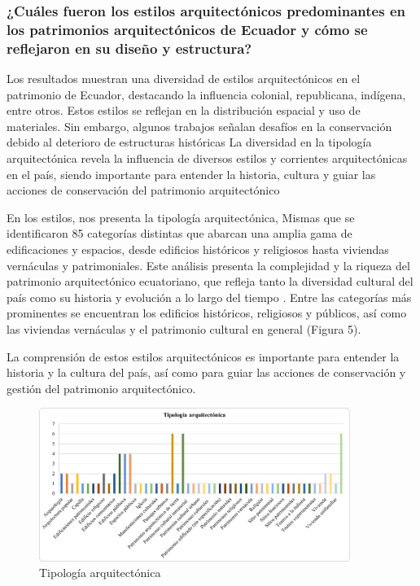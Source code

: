 \documentclass[journal,article,submit,pdftex,moreauthors]{Definitions/mdpi}
\begin{document}
\subsubsection{\textbf{¿Cuáles fueron los estilos arquitectónicos predominantes en los patrimonios arquitectónicos de Ecuador y cómo se reflejaron en su diseño y estructura?}}
\par %
Los resultados muestran una diversidad de estilos arquitectónicos en el patrimonio de Ecuador, destacando la influencia colonial, republicana, indígena, entre otros. Estos estilos se reflejan en la distribución espacial y uso de materiales. Sin embargo, algunos trabajos señalan desafíos en la conservación debido al deterioro de estructuras históricas \cite{art:articulo18} La diversidad en la tipología arquitectónica revela la influencia de diversos estilos y corrientes arquitectónicas en el país, siendo importante para entender la historia, cultura y guiar las acciones de conservación del patrimonio arquitectónico \cite{art:articulo17}
\par %
En los estilos, nos presenta la tipología arquitectónica, Mismas que se identificaron 85 categorías distintas que abarcan una amplia gama de edificaciones y espacios, desde edificios históricos y religiosos hasta viviendas vernáculas y patrimoniales. Este análisis presenta la complejidad y la riqueza del patrimonio arquitectónico ecuatoriano, que refleja tanto la diversidad cultural del país como su historia y evolución a lo largo del tiempo \cite{art:articulo19}. Entre las categorías más prominentes se encuentran los edificios históricos, religiosos y públicos, así como las viviendas vernáculas y el patrimonio cultural en general (Figura 5)\cite{art:articulo20}.
\par %
La comprensión de estos estilos arquitectónicos es importante para entender la historia y la cultura del país, así como para guiar las acciones de conservación y gestión del patrimonio arquitectónico.
 \par %
  \begin{figure} [h!]
    \centering
    \includegraphics[width=0.9\textwidth]{Graficos/Tipología arquitectónica.png }
    \caption{Tipología arquitectónica}
    \label{fig:grafico}
\end{figure}
\end{document}
